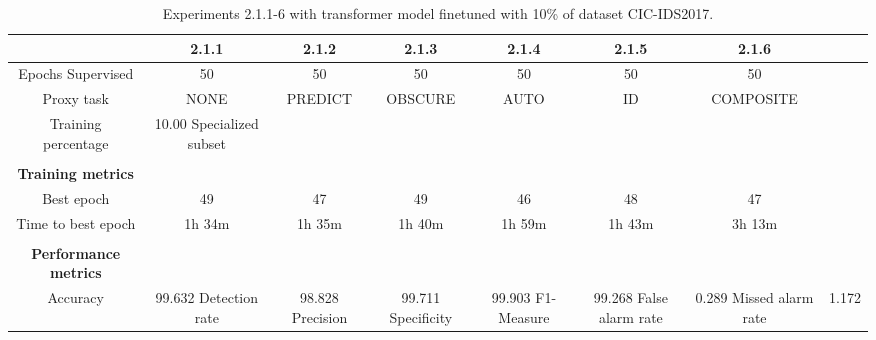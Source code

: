 \begin{table}[htb]
    \centering
    \begin{tabular}{@{}ccccccc@{}}
        \toprule
         & 2.1.1 & 2.1.2 & 2.1.3 & 2.1.4 & 2.1.5 & 2.1.6 \\
        \midrule
        Epochs Supervised &  50 &  50 &  50 &  50 &  50 &  50 \\
        Proxy task &  NONE &  PREDICT &  OBSCURE &  AUTO &  ID &  COMPOSITE \\
        Training percentage &  10.00 %
        Specialized subset &   &   &   &   &   &   \\
         \\
        \textbf{Training metrics} &  &  &  &  &  &  \\
        Best epoch &  49 &  47 &  49 &  46 &  48 &  47 \\
        Time to best epoch &  1h 34m &  1h 35m &  1h 40m &  1h 59m &  1h 43m &  3h 13m \\
         \\
        \textbf{Performance metrics} &  &  &  &  &  &  \\
        Accuracy &  99.632 %
        Detection rate &  98.828 %
        Precision &  99.711 %
        Specificity &  99.903 %
        F1-Measure &  99.268 %
        False alarm rate &  0.289 %
        Missed alarm rate &  1.172 %
        \bottomrule
    \end{tabular}
    \caption{Experiments 2.1.1-6 with transformer model finetuned with 10\% of dataset CIC-IDS2017.}
    \label{table:results:lstm:stats_flows10}
\end{table}